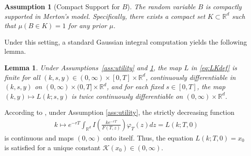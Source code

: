 \documentclass[11pt]{article}
\newtheorem{lemma}{Lemma}
\newtheorem{assumption}{Assumption}
\theoremstyle{definition}
\begin{document}
\begin{assumption}[Compact Support for $B$]
\label{ass:compact_B}
The random variable $B$ is compactly supported in Merton's model.  Specifically, %
there exists a compact set $K \subset \mathbb{R}^d$ such that $\mu(B \in K) = 1$ for any prior $\mu$. %
\end{assumption}

Under this setting, a standard Gaussian integral computation yields the following lemma.
\begin{lemma}\label{lem:Lregularity}
Under Assumptions~\ref{ass:utility} and \ref{ass:compact_B}, the map $L$ in \eqref{eq:LKdef} is finite for all $(k,s,y)\in(0,\infty)\times[0,T]\times\mathbb{R}^d$, continuously differentiable in $(k,s,y)$ on $(0,\infty)\times(0,T]\times\mathbb{R}^d$, and for each fixed \(s\in[0,T]\), the map \((k,y)\mapsto L(k;s,y)\) is twice continuously differentiable on \((0,\infty)\times\mathbb R^d\).
\end{lemma}

According to \cite{KZ98}, under Assumption \ref{ass:utility}, the strictly decreasing function
\begin{equation}\label{eq:Lagr}
\begin{aligned}
    k \mapsto e^{-rT} \int_{\mathbb{R}^d} I\left( \frac{ke^{-r T}}{F(T, z)} \right) \varphi_T(z) d z = L(k; T, 0)
\end{aligned}
\end{equation}
is continuous and maps $(0, \infty)$ onto itself. Thus, the equation $L(k; T, 0) = x_0$ is satisfied for a unique constant $\mathcal{K}(x_0) \in (0, \infty)$.  
\end{document}
